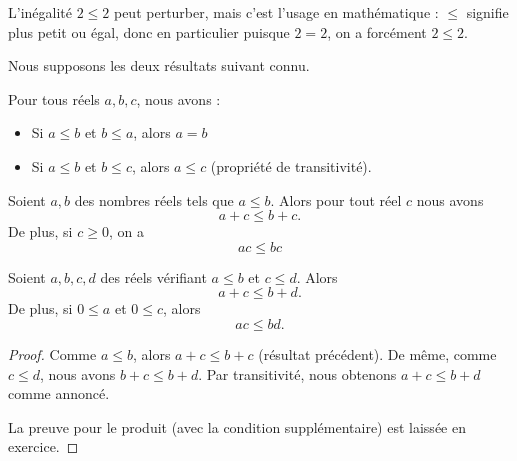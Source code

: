 \begin{frame}
  \begin{remark*}
    L'inégalité \(2 \leq 2\) peut perturber, mais c'est l'usage en mathématique : \(\leq\) signifie \og plus petit ou égal\fg{}, donc en particulier puisque \(2 = 2\), on a forcément \(2 \leq 2\).
  \end{remark*}
\end{frame}

\begin{frame}
  Nous supposons les deux résultats suivant connu.
  \begin{property}%
    Pour tous réels \(a,b,c\), nous avons :
    \begin{itemize}
    \item Si \(a \leq b\) et \(b \leq a\), alors \(a = b\)
    \item Si \(a \leq b\) et \(b \leq c\), alors \(a \leq c\) (propriété de transitivité).
    \end{itemize}
  \end{property}
  \begin{property}%
    Soient \(a,b\) des nombres réels tels que \(a \leq b\). Alors pour tout réel \(c\) nous avons
    \begin{equation*}
      a + c \leq b + c.
    \end{equation*}
    De plus, si \(c \geq 0\), on a
    \begin{equation*}
      ac \leq bc
    \end{equation*}
  \end{property}
\end{frame}

\begin{frame}
  \begin{proposition}\label{prop:inegalites}
    Soient \(a,b,c,d\) des réels vérifiant \(a \leq b\) et \(c \leq d\). Alors
    \begin{equation*}
      a+c \leq b+d.
    \end{equation*}
    De plus, si \(0 \leq a\) et \(0 \leq c\), alors
    \begin{equation*}
      ac \leq bd.
    \end{equation*}
  \end{proposition}
  \begin{proof}
    Comme \(a \leq b\), alors \(a + c \leq b + c\) (résultat précédent). De même, comme \(c \leq d\), nous avons \(b + c \leq b + d\). Par transitivité, nous obtenons \(a + c \leq b + d\) comme annoncé.

    La preuve pour le produit (avec la condition supplémentaire) est laissée en exercice.
  \end{proof}
\end{frame}

